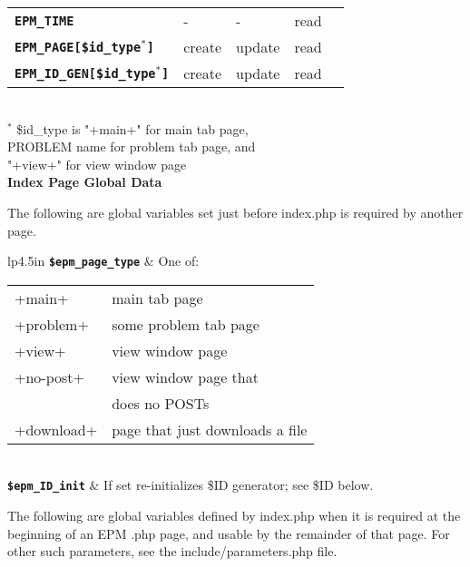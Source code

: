 \documentclass[12pt]{article}
\newcommand{\TT}[1]{{\tt \bfseries #1}}
\begin{document}
\begin{center}
\begin{tabular}{lllll}
\TT{EPM\_TIME}		& -  & -      & read \\
\TT{EPM\_PAGE[\$id\_type$^*$]}	& create  & update  & read \\
\TT{EPM\_ID\_GEN[\$id\_type$^*$]}	& create  & update  & read \\
\end{tabular}
\\[1ex]
$^*$ \$id\_type is "+main+" for main tab page,\\
PROBLEM name for problem tab page, and \\
"+view+" for view window page
\\[3ex]
{\bf Index Page Global Data}
\end{center}

The following are global variables set just before index.php
is required by another page.

\begin{center}
\begin{tabular}{lp{4.5in}}
\TT{\$epm\_page\_type}	& One of: \begin{tabular}[t]{ll}
                          +main+ & main tab page \\
			  +problem+ & some problem tab page \\
			  +view+ & view window page \\
			  +no-post+ & view window page that \\
			            & does no POSTs \\
			  +download+ & page that just downloads a file \\
			  \end{tabular}
\\[0.5ex]
\TT{\$epm\_ID\_init}	& If set re-initializes \$ID generator;
                          see \$ID below. \\
\end{tabular}
\end{center}

The following are global variables defined by index.php when it is
required at the beginning of an EPM .php page, and usable
by the remainder of that page.  For other such parameters,
see the include/parameters.php file.
\end{document}
